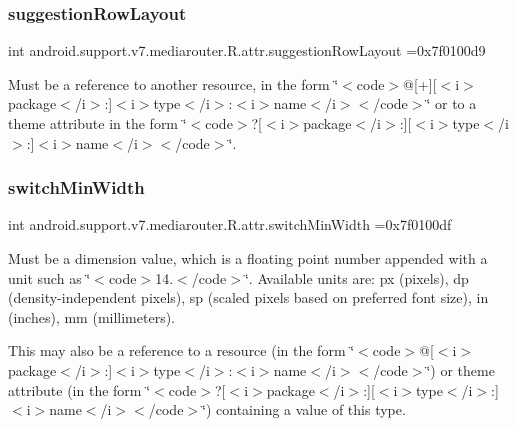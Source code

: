 \subsubsection{\texorpdfstring{suggestion\+Row\+Layout}{suggestionRowLayout}}
{\footnotesize\ttfamily int android.\+support.\+v7.\+mediarouter.\+R.\+attr.\+suggestion\+Row\+Layout =0x7f0100d9\hspace{0.3cm}{\ttfamily [static]}}

Must be a reference to another resource, in the form \char`\"{}$<$code$>$@\mbox{[}+\mbox{]}\mbox{[}$<$i$>$package$<$/i$>$\+:\mbox{]}$<$i$>$type$<$/i$>$\+:$<$i$>$name$<$/i$>$$<$/code$>$\char`\"{} or to a theme attribute in the form \char`\"{}$<$code$>$?\mbox{[}$<$i$>$package$<$/i$>$\+:\mbox{]}\mbox{[}$<$i$>$type$<$/i$>$\+:\mbox{]}$<$i$>$name$<$/i$>$$<$/code$>$\char`\"{}. \mbox{\label{classandroid_1_1support_1_1v7_1_1mediarouter_1_1R_1_1attr_aa47dc02fb71f6a3ef5a758229456828c}} 
\subsubsection{\texorpdfstring{switch\+Min\+Width}{switchMinWidth}}
{\footnotesize\ttfamily int android.\+support.\+v7.\+mediarouter.\+R.\+attr.\+switch\+Min\+Width =0x7f0100df\hspace{0.3cm}{\ttfamily [static]}}

Must be a dimension value, which is a floating point number appended with a unit such as \char`\"{}$<$code$>$14.\+5sp$<$/code$>$\char`\"{}. Available units are\+: px (pixels), dp (density-\/independent pixels), sp (scaled pixels based on preferred font size), in (inches), mm (millimeters). 

This may also be a reference to a resource (in the form \char`\"{}$<$code$>$@\mbox{[}$<$i$>$package$<$/i$>$\+:\mbox{]}$<$i$>$type$<$/i$>$\+:$<$i$>$name$<$/i$>$$<$/code$>$\char`\"{}) or theme attribute (in the form \char`\"{}$<$code$>$?\mbox{[}$<$i$>$package$<$/i$>$\+:\mbox{]}\mbox{[}$<$i$>$type$<$/i$>$\+:\mbox{]}$<$i$>$name$<$/i$>$$<$/code$>$\char`\"{}) containing a value of this type. \mbox{\label{classandroid_1_1support_1_1v7_1_1mediarouter_1_1R_1_1attr_a001d27a3e0d1776fea64d26a770af4a5}} 
